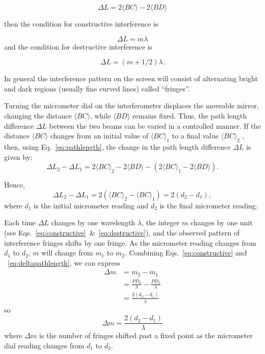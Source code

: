 \begin{equation}
\Delta L = 2\langle BC\rangle - 2\langle BD\rangle 
\label{eq:pathlength}
\end{equation}

then the condition for constructive interference is 

\begin{equation}
 \Delta L = m\lambda
\label{eq:constructive}
\end{equation}
and the condition for destructive interference is

\begin{equation}
\Delta L = (m+1/2)\lambda.
\label{eq:destructive}
\end{equation}

In general the interference pattern on the screen will consist of alternating
bright and dark regions (usually fine curved lines) called
``fringes''.

Turning the micrometer dial on the interferometer displaces the moveable mirror,
changing the distance $\langle BC \rangle$, while $\langle BD\rangle $ remains
fixed. Thus, the path length difference $\Delta L$ between the two beams can be varied
in a controlled manner. If the distance $\langle BC\rangle$ changes from an
initial value of $\langle BC\rangle_{1}$ to a final value $\langle
BC\rangle_{2}$ , then, using Eq.~\ref{eq:pathlength}, the change in the path
length difference $\Delta L$ is given by:
\begin{equation}
 \Delta L_2 - \Delta L_{1} = 2\langle BC\rangle_{2} - 2\langle BD\rangle - (2\langle
 BC\rangle_{1} - 2\langle BD\rangle).
\label{eq:deltapathlength}
\end{equation}

\noindent Hence,
\begin{equation}
\Delta L_{2} - \Delta L_{1} = 2(\langle BC\rangle_{2}  - \langle BC\rangle_{1}) = 2(d_{2} -
d_{1}),
\end{equation}
\noindent where $d_{1}$ is the initial micrometer reading and $d_{2}$ is the
final micrometer reading. 

Each time $\Delta L$ changes by one wavelength $\lambda$, the integer $m$ changes
by one unit (see Eqs.~\ref{eq:constructive}~\&~\ref{eq:destructive}), and the
observed pattern of interference fringes shifts by one fringe. As the micrometer
reading changes from $d_{1}$ to $d_{2}$, $m$ will change from $m_{1}$ to
$m_{2}$. Combining Eqs.~\ref{eq:constructive} and ~\ref{eq:deltapathlength}, we
can express 
\begin{align}
 \Delta m &= m_2 - m_1 \nonumber \\
 &= \frac{PD_{2}}{\lambda} - \frac{PD_{1}}{\lambda} \nonumber \\
 &= \frac{2(d_{2} - d_{1})} {\lambda} \nonumber
\end{align}
so
\begin{equation}
\boxed{\Delta m = \frac{2(d_{2} - d_{1})} {\lambda}}
\label{eq:delta-m}
\end{equation}
where $\Delta m$ is the number of fringes shifted past a fixed point as the
micrometer dial reading changes from $d_{1}$ to $d_{2}$. 

